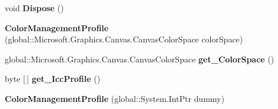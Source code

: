 \begin{DoxyCompactItemize}
void {\bfseries Dispose} ()
\item 
\mbox{\label{class_microsoft_1_1_graphics_1_1_canvas_1_1_effects_1_1_color_management_profile_a173e23f67a047494990b4416994c991f}} 
{\bfseries Color\+Management\+Profile} (global\+::\+Microsoft.\+Graphics.\+Canvas.\+Canvas\+Color\+Space color\+Space)
\item 
\mbox{\label{class_microsoft_1_1_graphics_1_1_canvas_1_1_effects_1_1_color_management_profile_a58a53a5e50e93694c3fea9d140b318a1}} 
global\+::\+Microsoft.\+Graphics.\+Canvas.\+Canvas\+Color\+Space {\bfseries get\+\_\+\+Color\+Space} ()
\item 
\mbox{\label{class_microsoft_1_1_graphics_1_1_canvas_1_1_effects_1_1_color_management_profile_a6b875165a264f5db1bd62570734da15c}} 
byte \mbox{[}$\,$\mbox{]} {\bfseries get\+\_\+\+Icc\+Profile} ()
\item 
\mbox{\label{class_microsoft_1_1_graphics_1_1_canvas_1_1_effects_1_1_color_management_profile_a987399d0da3c1dfbd61121d6a15e1442}} 
{\bfseries Color\+Management\+Profile} (global\+::\+System.\+Int\+Ptr dummy)
\end{DoxyCompactItemize}
